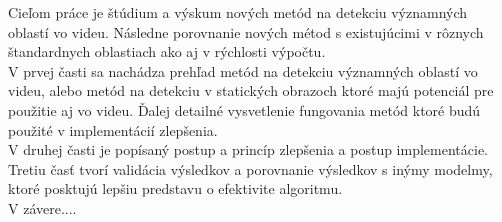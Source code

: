 Cieľom práce je štúdium a výskum nových metód na detekciu významných oblastí vo videu.
Následne porovnanie nových métod s existujúcimi v rôznych štandardnych oblastiach ako aj v rýchlosti výpočtu.
\\
V prvej časti sa nachádza prehľad metód na detekciu významných oblastí vo videu, alebo metód na detekciu v statických obrazoch ktoré majú potenciál pre použitie aj vo videu.
Ďalej detailné vysvetlenie fungovania metód ktoré budú použité v implementácií zlepšenia.
\\
V druhej časti je popísaný postup a princíp zlepšenia a postup implementácie.
Tretiu časť tvorí validácia výsledkov a porovnanie výsledkov s inýmy modelmy, ktoré posktujú lepšiu predstavu o efektivite algoritmu.
\\
V závere....
